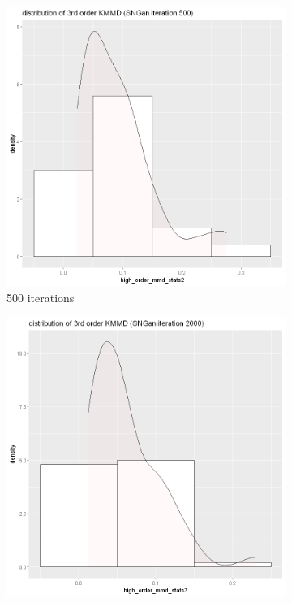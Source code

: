 \documentclass{article}
\begin{document}
\begin{figure}[h!]
    \caption{Dataset Anime}
     \centering
     \begin{subfigure}[b]{0.3\textwidth}
         \centering
         \includegraphics[width=\textwidth]{kmmd_figures/sngan_anime_highdist_500.png}
         \caption{500 iterations}
     \end{subfigure}
     \hfill
     \begin{subfigure}[b]{0.3\textwidth}
         \centering
         \includegraphics[width=\textwidth]{kmmd_figures/sngan_anime_highdist_2000.png}

\end{subfigure}
\end{figure}
\end{document}
